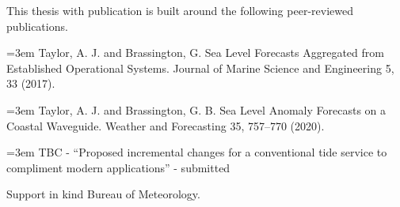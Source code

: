 
\begin{preface}

This thesis with publication is built around the following peer-reviewed publications. 

\vspace{5mm}
\hangindent=3em
Taylor, A. J. and Brassington, G. Sea Level Forecasts Aggregated from Established Operational Systems. Journal of Marine Science and Engineering 5, 33 (2017).



\vspace{5mm}
\hangindent=3em
Taylor, A. J. and Brassington, G. B. Sea Level Anomaly Forecasts on a Coastal Waveguide. Weather and Forecasting 35, 757–770 (2020).



\vspace{5mm}
\hangindent=3em
TBC - ``Proposed incremental changes for a conventional tide service to compliment modern applications''  - submitted


\vspace{5mm}
\noindent  Support in kind Bureau of Meteorology. 


\end{preface}

